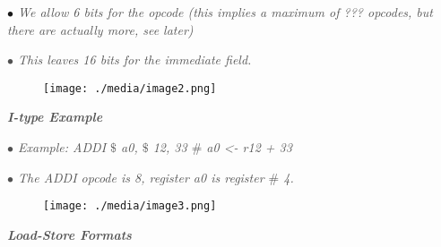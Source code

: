\documentclass[12pt]{article}
\begin{document}
\begin{adjustwidth}{0.5in}{0.0in}
\textit{$\bullet$  \textcolor[HTML]{525252}{We allow 6 bits for the opcode (this implies a maximum of ??? opcodes, but there are actually more, see later) }}\par

\end{adjustwidth}

\textit{\textcolor[HTML]{525252}{$\bullet$  This leaves 16 bits for the immediate field.}}\par




\begin{figure}[H]
	\begin{Center}
		\texttt{[image: ./media/image2.png]}
	\end{Center}
\end{figure}



\par

{\fontsize{14pt}{16.8pt}\selectfont \textbf{\textit{\textcolor[HTML]{525252}{I-type Example}}}\par}\par

\textit{\textcolor[HTML]{525252}{$\bullet$  Example: ADDI $\$$ a0, $\$$ 12, 33 $\#$  a0 <- r12 + 33}}\par

\textit{\textcolor[HTML]{525252}{$\bullet$  The ADDI opcode is 8, register a0 is register $\#$  4.}}\par




\begin{figure}[H]
	\begin{Center}
		\texttt{[image: ./media/image3.png]}
	\end{Center}
\end{figure}



\par

{\fontsize{14pt}{16.8pt}\selectfont \textbf{\textit{\textcolor[HTML]{525252}{Load-Store Formats}}}\par}\par
\end{document}
